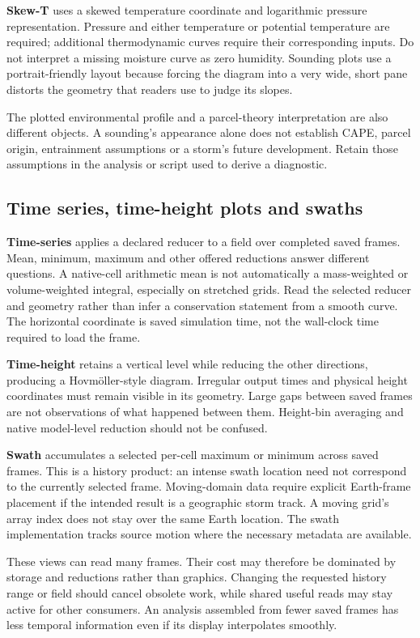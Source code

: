 \textbf{Skew-T} uses a skewed temperature coordinate and logarithmic pressure
representation. Pressure and either temperature or potential temperature are
required; additional thermodynamic curves require their corresponding inputs.
Do not interpret a missing moisture curve as zero humidity. Sounding plots use
a portrait-friendly layout because forcing the diagram into a very wide, short
pane distorts the geometry that readers use to judge its slopes.

The plotted environmental profile and a parcel-theory interpretation are also
different objects. A sounding's appearance alone does not establish CAPE, parcel
origin, entrainment assumptions or a storm's future development. Retain those
assumptions in the analysis or script used to derive a diagnostic.

\subsection{Time series, time-height plots and swaths}
\textbf{Time-series} applies a declared reducer to a field over completed saved
frames. Mean, minimum, maximum and other offered reductions answer different
questions. A native-cell arithmetic mean is not automatically a mass-weighted
or volume-weighted integral, especially on stretched grids. Read the selected
reducer and geometry rather than infer a conservation statement from a smooth
curve. The horizontal coordinate is saved simulation time, not the wall-clock
time required to load the frame.

\textbf{Time-height} retains a vertical level while reducing the other
directions, producing a Hovmöller-style diagram. Irregular output times and
physical height coordinates must remain visible in its geometry. Large gaps
between saved frames are not observations of what happened between them.
Height-bin averaging and native model-level reduction should not be confused.

\textbf{Swath} accumulates a selected per-cell maximum or minimum across saved
frames. This is a history product: an intense swath location need not correspond
to the currently selected frame. Moving-domain data require explicit Earth-frame
placement if the intended result is a geographic storm track. A moving grid's
array index does not stay over the same Earth location. The swath implementation
tracks source motion where the necessary metadata are available.

These views can read many frames. Their cost may therefore be dominated by
storage and reductions rather than graphics. Changing the requested history
range or field should cancel obsolete work, while shared useful reads may stay
active for other consumers. An analysis assembled from fewer saved frames has
less temporal information even if its display interpolates smoothly.

